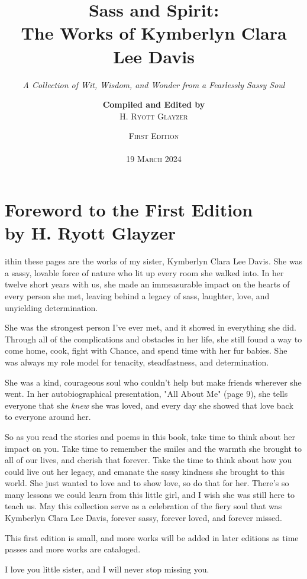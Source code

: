 \documentclass[10pt]{report}
\title{\Huge Sass and Spirit:\\\Large The Works of Kymberlyn Clara Lee Davis}
\subtitle{%
  \normalsize \textit{%
    A Collection of Wit, Wisdom, and Wonder from a Fearlessly Sassy Soul
  }
}
\author{\textbf{Compiled and Edited by}\\\small \textsc{H. Ryott Glayzer}}
\date{%
  \small \textsc{First Edition}\\
  \;\\
  \large \textsc{19 March 2024}
}
\begin{document}
\maketitle



\chapter*{%
  \LARGE Foreword to the First Edition\\
  \small by H. Ryott Glayzer
}%
\lettrine{}{  }
ithin these pages are the works of my sister, Kymberlyn Clara Lee Davis.
She was a sassy, lovable force of nature who lit up every room she walked into.
In her twelve short years with us, she made an immeasurable impact on the
hearts of every person she met, leaving behind a legacy of sass,
laughter, love, and unyielding determination.

She was the strongest person I've ever met, and it showed in everything she did.
Through all of the complications and obstacles in her life,
she still found a way to come home, cook, fight with Chance,
and spend time with her fur babies.
She was always my role model for 
tenacity, steadfastness, and determination.\ 

She was a kind, courageous soul who couldn't help but make friends
wherever she went.
In her autobiographical presentation, "All About Me" (page 9), 
she tells everyone that she \textit{knew} she was loved, and
every day she showed that love back to everyone around her.

So as you read the stories and poems in this book, 
take time to think about her impact on you.
Take time to remember the smiles and the warmth she brought
to all of our lives, and cherish that forever.
Take the time to think about how you could live out her legacy,
and emanate the sassy kindness she brought to this world.
She just wanted to love and to show love, so do that for her.
There's so many lessons we could learn from this little girl,
and I wish she was still here to teach us.
May this collection serve as a celebration of 
the fiery soul that was Kymberlyn Clara Lee Davis, 
forever sassy, forever loved, and forever missed.

This first edition is small, and more works will be added in later editions as
time passes and more works are cataloged.

I love you little sister, and I will never stop missing you.
\clearpage
\end{document}
